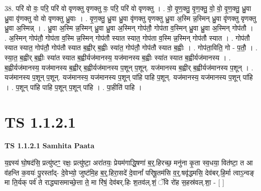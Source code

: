 \documentclass[17pt]{extarticle}
\begin{document}
38. परि॑ वो वः॒ परि॒ परि॑ वो वृणक्तु वृणक्तु वः॒ परि॒ परि॑ वो वृणक्तु । . वो॒ वृ॒ण॒क्तु॒ वृ॒ण॒क्तु॒ वो॒ वो॒ वृ॒ण॒क्तु॒ ध्रु॒वा ध्रु॒वा वृ॑णक्तु वो वो वृणक्तु ध्रु॒वाः । . वृ॒ण॒क्तु॒ ध्रु॒वा ध्रु॒वा वृ॑णक्तु वृणक्तु ध्रु॒वा अ॒स्मि न्न॒स्मिन् ध्रु॒वा वृ॑णक्तु वृणक्तु ध्रु॒वा अ॒स्मिन्न् । . ध्रु॒वा अ॒स्मि न्न॒स्मिन् ध्रु॒वा ध्रु॒वा अ॒स्मिन् गोप॑तौ॒ गोप॑ता व॒स्मिन् ध्रु॒वा ध्रु॒वा अ॒स्मिन् गोप॑तौ । . अ॒स्मिन् गोप॑तौ॒ गोप॑ता व॒स्मि न्न॒स्मिन् गोप॑तौ स्यात स्यात॒ गोप॑ता व॒स्मि न्न॒स्मिन् गोप॑तौ स्यात । . गोप॑तौ स्यात स्यात॒ गोप॑तौ॒ गोप॑तौ स्यात ब॒ह्वीर् ब॒ह्वीः स्या॑त॒ गोप॑तौ॒ गोप॑तौ स्यात ब॒ह्वीः । . गोप॑ता॒विति॒ गो - प॒तौ॒ । . स्या॒त॒ ब॒ह्वीर् ब॒ह्वीः स्या॑त स्यात ब॒ह्वीर्यज॑मानस्य॒ यज॑मानस्य ब॒ह्वीः स्या॑त स्यात ब॒ह्वीर्यज॑मानस्य । . ब॒ह्वीर्यज॑मानस्य॒ यज॑मानस्य ब॒ह्वीर् ब॒ह्वीर्यज॑मानस्य प॒शून् प॒शून्. यज॑मानस्य ब॒ह्वीर् ब॒ह्वीर्यज॑मानस्य प॒शून् । . यज॑मानस्य प॒शून् प॒शून्. यज॑मानस्य॒ यज॑मानस्य प॒शून् पा॑हि पाहि प॒शून्. यज॑मानस्य॒ यज॑मानस्य प॒शून् पा॑हि । . प॒शून् पा॑हि पाहि प॒शून् प॒शून् पा॑हि । . पा॒हीति॑ पाहि । \newline
\pagebreak
{}
\section*{ TS 1.1.2.1 }

\textbf{TS 1.1.2.1 } \newline
\textbf{Samhita Paata} \newline

य॒ज्ञ्स्य॑ घो॒षद॑सि॒ प्रत्यु॑ष्टꣳ॒॒ रक्षः॒ प्रत्यु॑ष्टा॒ अरा॑तयः॒ प्रेयम॑गाद्धि॒षणा॑ ब॒र्॒.हिरच्छ॒ मनु॑ना कृ॒ता स्व॒धया॒ वित॑ष्टा॒ त आ व॑हन्ति क॒वयः॑ पु॒रस्ता᳚द्- दे॒वेभ्यो॒ जुष्ट॑मि॒ह ब॒र्॒.हिरा॒सदे॑ दे॒वानां᳚ परिषू॒तम॑सि व॒र्॒.षवृ॑द्धमसि॒ देव॑बर्.हि॒र्मा त्वाऽ॒न्वङ् मा ति॒र्यक् पर्व॑ ते राद्ध्यासमाच्छे॒त्ता ते॒ मा रि॑षं॒ देव॑बर्.हिः श॒तव॑ल्.शं॒ ॅवि रो॑ह स॒हस्र॑वल्.शा॒ - [ ] \newline
\end{document}
